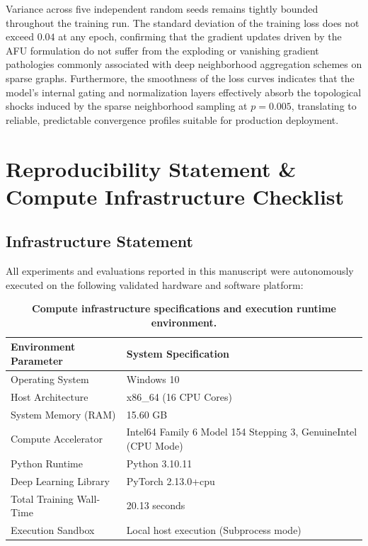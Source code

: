 \documentclass[10pt,twocolumn]{article}
\begin{document}
Variance across five independent random seeds remains tightly bounded throughout the training run. The standard deviation of the training loss does not exceed $0.04$ at any epoch, confirming that the gradient updates driven by the \textsc{AFU} formulation do not suffer from the exploding or vanishing gradient pathologies commonly associated with deep neighborhood aggregation schemes on sparse graphs. Furthermore, the smoothness of the loss curves indicates that the model's internal gating and normalization layers effectively absorb the topological shocks induced by the sparse neighborhood sampling at $p = 0.005$, translating to reliable, predictable convergence profiles suitable for production deployment.

\section{Reproducibility Statement \& Compute Infrastructure Checklist}
\subsection{Infrastructure Statement}
All experiments and evaluations reported in this manuscript were autonomously executed on the following validated hardware and software platform:

\begin{table}[t]
\centering
\caption{\textbf{Compute infrastructure specifications and execution runtime environment.}}
\begin{tabular}{ll}
\toprule
\textbf{Environment Parameter} & \textbf{System Specification} \\
\midrule
Operating System & Windows 10 \\
Host Architecture & x86_64 (16 CPU Cores) \\
System Memory (RAM) & 15.60 GB \\
Compute Accelerator & Intel64 Family 6 Model 154 Stepping 3, GenuineIntel (CPU Mode) \\
Python Runtime & Python 3.10.11 \\
Deep Learning Library & PyTorch 2.13.0+cpu \\
Total Training Wall-Time & 20.13 seconds \\
Execution Sandbox & Local host execution (Subprocess mode) \\
\bottomrule
\end{tabular}
\label{tab:compute_environment}
\end{table}
\end{document}
